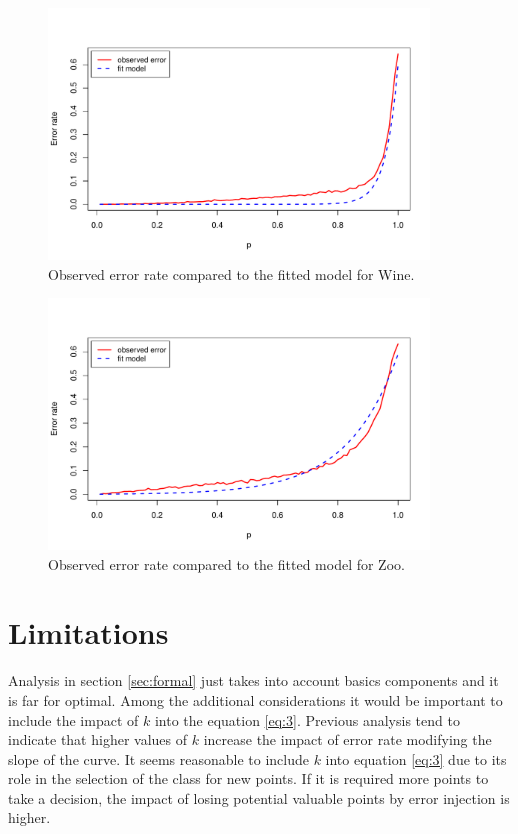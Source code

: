 \documentclass{article}
\begin{document}
\begin{figure}
 \centering
 \includegraphics[width=0.9\textwidth]{./figures/wine.pdf}
 \caption{Observed error rate compared to the fitted model for Wine.}
 \label{fig:wine}
\end{figure}

\begin{figure}
 \centering
 \includegraphics[width=0.9\textwidth]{./figures/zoo.pdf}
 \caption{Observed error rate compared to the fitted model for Zoo.}
 \label{fig:zoo}
\end{figure}

\section{Limitations}
Analysis in section \ref{sec:formal} just takes into account basics components and it is far for optimal.  Among the additional considerations it would be important to include the impact of $k$ into the equation \ref{eq:3}.  Previous analysis tend to indicate that higher values of $k$ increase the impact of error rate modifying the slope of the curve.  It seems reasonable to include $k$ into equation \ref{eq:3} due to its role in the selection of the class for new points.  If it is required more points to take a decision, the impact of losing potential valuable points by error injection is higher.
\end{document}
